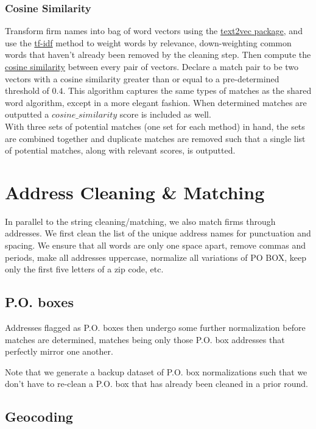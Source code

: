 \documentclass{article}
\begin{document}
\subsubsection{Cosine Similarity}
Transform firm names into bag of word vectors using the \href{http://text2vec.org/}{text2vec package}, and use the \href{https://en.wikipedia.org/wiki/Tf\%E2\%80\%93idf}{tf-idf} method to weight words by relevance, down-weighting common words that haven't already been removed by the cleaning step. Then compute the \href{https://en.wikipedia.org/wiki/Cosine_similarity}{cosine similarity} between every pair of vectors. Declare a match pair to be two vectors with a cosine similarity greater than or equal to a pre-determined threshold of $0.4$. This algorithm captures the same types of matches as the shared word algorithm, except in a more elegant fashion. When determined matches are outputted a $cosine\_similarity$ score is included as well. \\

With three sets of potential matches (one set for each method) in hand, the sets are combined together and duplicate matches are removed such that a single list of potential matches, along with relevant scores, is outputted.

\section{Address Cleaning \& Matching}

In parallel to the string cleaning/matching, we also match firms through addresses. 
We first clean the list of the unique address names for punctuation and spacing. We ensure that all words are only one space apart, remove commas and periods, make all addresses uppercase, normalize all variations of PO BOX, keep only the first five letters of a zip code, etc.

\subsection{P.O. boxes}
Addresses flagged as P.O. boxes then undergo some further normalization before matches are determined, matches being only those P.O. box addresses that perfectly mirror one another. 

Note that we generate a backup dataset of P.O. box normalizations such that we don't have to re-clean a P.O. box that has already been cleaned in a prior round. 
\subsection{Geocoding}
\end{document}
